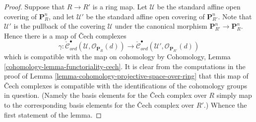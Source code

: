 \documentclass[10pt,a4paper]{amsart}
\theoremstyle{plain}
\theoremstyle{definition}
\theoremstyle{remark}
\numberwithin{equation}{subsection}
\begin{document}
\begin{proof}
Suppose that $R \to R'$ is a ring map.
Let $\mathcal{U}$ be the standard affine open covering of $\mathbf{P}^n_R$,
and let $\mathcal{U}'$ be the standard affine open covering of
$\mathbf{P}^n_{R'}$. Note that $\mathcal{U}'$ is the pullback of the covering
$\mathcal{U}$ under the canonical morphism
$\mathbf{P}^n_{R'} \to \mathbf{P}^n_R$. Hence there
is a map of {\v C}ech complexes
$$
\gamma :
\check{\mathcal{C}}_{ord}^\bullet(\mathcal{U},
\mathcal{O}_{\mathbf{P}_R}(d))
\longrightarrow
\check{\mathcal{C}}_{ord}^\bullet(\mathcal{U}',
\mathcal{O}_{\mathbf{P}_{R'}}(d))
$$
which is compatible with the map on cohomology by
Cohomology, Lemma \ref{cohomology-lemma-functoriality-cech}.
It is clear from the computations in the proof of
Lemma \ref{lemma-cohomology-projective-space-over-ring}
that this map of {\v C}ech complexes is compatible with the identifications
of the cohomology groups in question. (Namely the basis elements for
the {\v C}ech complex over $R$ simply map to the corresponding basis elements
for the {\v C}ech complex over $R'$.) Whence the first statement of the lemma.


\end{proof}
\end{document}
